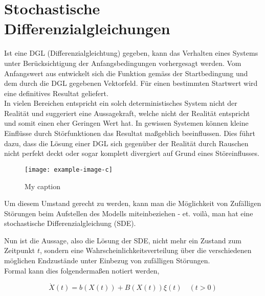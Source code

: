 %
%
%
%
\section{Stochastische Differenzialgleichungen\label{brown:section:teil1}}

Ist eine DGL (Differenzialgleichtung) gegeben, kann das Verhalten eines Systems unter Berücksichtigung der Anfangsbedingungen vorhergesagt werden. Vom Anfangswert aus entwickelt sich die Funktion gemäss der Startbedingung und dem durch die DGL gegebenen Vektorfeld. Für einen bestimmten Startwert wird eine definitives Resultat geliefert.\\


In vielen Bereichen entspricht ein solch deterministisches System  nicht der Realität und suggeriert eine Aussagekraft, welche nicht der Realität entspricht und somit einen eher Geringen Wert hat. In gewissen Systemen können kleine Einflüsse durch Störfunktionen das Resultat maßgeblich beeinflussen. Dies führt dazu, dass die Lösung einer DGL sich gegenüber der Realität durch Rauschen nicht perfekt deckt oder sogar komplett divergiert auf Grund eines Störeinflusses.


\begin{figure} [h]
	\centering
	\noindent\texttt{[image: example-image-c]} \label{fig:label}
	\caption{My caption}
\end{figure}


Um diesem Umstand gerecht zu werden, kann man die Möglichkeit von Zufälligen Störungen beim Aufstellen des Modells miteinbeziehen - et. voilà, man hat eine stochastische Differenzialgleichung (SDE).

Nun ist die Aussage, also die Lösung der SDE, nicht mehr ein Zustand zum Zeitpunkt $ t $, sondern eine Wahrscheinlichkeitsverteilung über die verschiedenen möglichen Endzustände unter Einbezug von zufälligen Störungen.\\


Formal kann dies folgendermaßen notiert werden, 

\begin{equation}
\dot{X}(t) = b(X(t)) + B(X(t))\xi(t) \quad (t>0)
\end{equation}

